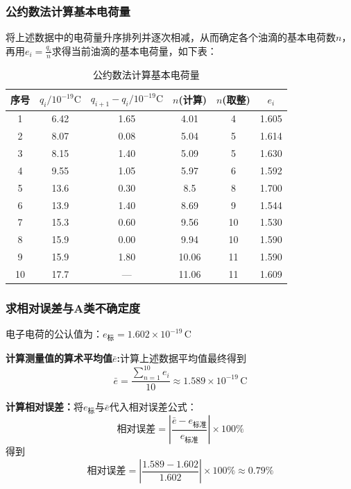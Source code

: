 \documentclass[]{../template/Report}%
\begin{document}
\begin{fullreportonly}
\subsubsection{公约数法计算基本电荷量}
将上述数据中的电荷量升序排列并逐次相减，从而确定各个油滴的基本电荷数$n$，再用$e_i=\frac{q_i}{n}$求得当前油滴的基本电荷量，如下表：
\begin{table}[htbp]
  \centering
  \caption{公约数法计算基本电荷量}
    \begin{tabular}{@{\hspace{1em}}cccccc@{\hspace{1em}}}
    \toprule
    序号 & \( q_i/10^{-19}\text{C} \) & \( q_{i+1}-q_i/10^{-19}\text{C} \) & \( n \)(计算)& \( n \)(取整) & \( e_i \) \\
    \midrule
    1 & 6.42 & 1.65 & 4.01 & 4 & 1.605 \\
    2 & 8.07 & 0.08 & 5.04 & 5 & 1.614 \\
    3 & 8.15 & 1.40 & 5.09 & 5 & 1.630 \\
    4 & 9.55 & 1.05 & 5.97 & 6 & 1.592 \\
    5 & 13.6 & 0.30 & 8.5 & 8 & 1.700 \\
    6 & 13.9 & 1.40 & 8.69 & 9 & 1.544 \\
    7 & 15.3 & 0.60 & 9.56 & 10 & 1.530 \\
    8 & 15.9 & 0.00 & 9.94 & 10 & 1.590 \\
    9 & 15.9 & 1.80 & 10.06 & 11 & 1.590 \\
    10 & 17.7 & — & 11.06 & 11 & 1.609 \\
    \bottomrule
  \end{tabular}
\end{table}
\clearpage
\subsubsection{求相对误差与A类不确定度}
电子电荷的公认值为：\(e_标 = 1.602 \times 10^{-19} \, \text{C}\)

\vspace{2mm}
\textbf{计算测量值的算术平均值\(\bar{e}\):}计算上述数据平均值最终得到
\[\bar{e}=\frac{\sum_{n = 1}^{10}e_i}{10}\approx 1.589 \times 10^{-19} \, \text{C}\]

\textbf{计算相对误差：}将$e_标与\bar{e}$代入相对误差公式：
\[\text{相对误差} = \left| \frac{\bar{e} - e_{\text{标准}}}{e_{\text{标准}}} \right| \times 100\%\]
得到
\[\text{相对误差} = \left| \frac{1.589 - 1.602}{1.602} \right| \times 100\% \approx 0.79\%\]


\end{fullreportonly}
\end{document}

